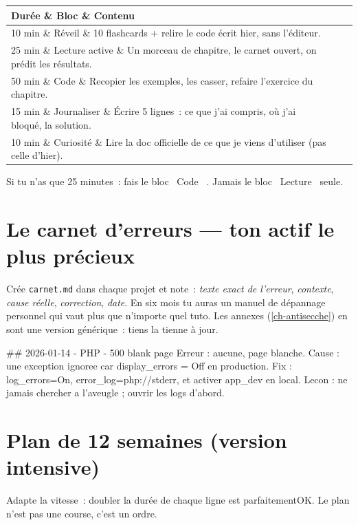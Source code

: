 \documentclass[12pt,a4paper,twoside,openright]{book}
\makeatletter
\newcommand{\fichier}[1]{\texttt{\color{pathgreen}#1}}
\newenvironment{tabz}[1]{\rowcolors{2}{white}{tralight}%
  \small\setlength{\tabcolsep}{5pt}\setlength{\LTpre}{3pt}\setlength{\LTpost}{3pt}%
  \begin{longtable}{@{}#1@{}}\toprule}
  {\bottomrule\end{longtable}\normalfont\setlength{\tabcolsep}{6pt}}
\newcommand{\thd}[1]{\textbf{\color{white}#1}}
\newcommand{\headrow}{\rowcolor{theadbg}}
\makeatother
\begin{document}
\begin{tabz}{llX}
  \headrow \thd{Dur\'ee} \& \thd{Bloc} \& \thd{Contenu} \\
  \midrule
  10 min \& R\'eveil \& 10 flashcards + relire le code \'ecrit hier, sans l'\'editeur. \\
  25 min \& Lecture active \& Un morceau de chapitre, le carnet ouvert, on pr\'edit les r\'esultats. \\
  50 min \& Code \& Recopier les exemples, les casser, refaire l'exercice du chapitre. \\
  15 min \& Journaliser \& \'Ecrire 5 lignes~: ce que j'ai compris, o\`u j'ai bloqu\'e, la solution. \\
  10 min \& Curiosit\'e \& Lire la doc officielle de ce que je viens d'utiliser (pas celle d'hier). \\
\end{tabz}

Si tu n'as que 25 minutes~: fais le bloc \og ~Code~ \fg{}. Jamais le bloc \og ~Lecture~ \fg{} seule.

\section{Le carnet d'erreurs --- ton actif le plus pr\'ecieux}

Cr\'ee \fichier{carnet.md} dans chaque projet et note~: \emph{texte exact de l'erreur},
\emph{contexte}, \emph{cause r\'eelle}, \emph{correction}, \emph{date}. En six mois tu auras un
manuel de d\'epannage personnel qui vaut plus que n'importe quel tuto. Les annexes
(\cref{ch-antisecche}) en sont une version g\'en\'erique~: tiens la tienne \`a jour.

\begin{codeconf}
## 2026-01-14 - PHP - 500 blank page
Erreur : aucune, page blanche.
Cause : une exception ignoree car display_errors = Off en production.
Fix : log_errors=On, error_log=php://stderr, et activer app_dev en local.
Lecon : ne jamais chercher a l'aveugle ; ouvrir les logs d'abord.
\end{codeconf}

\section{Plan de 12 semaines (version intensive)}

Adapte la vitesse~: doubler la dur\'ee de chaque ligne est parfaitementOK. Le plan n'est pas
une course, c'est un ordre.
\end{document}
